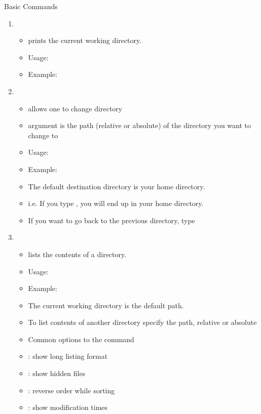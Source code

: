 \documentclass[10pt,t]{beamer}
\begin{document}
\begin{frame}{Basic Commands}
  \begin{enumerate}
  \item {}
    \begin{itemize}
    \item prints the current working directory.
    \item Usage: 
    \item Example: 
    \end{itemize}
  \item {}
    \begin{itemize}
    \item allows one to change directory
    \item argument is the path (relative or absolute) of the directory you want to change to
    \item Usage: 
    \item Example: 
    \item The default destination directory is your home directory.
    \item i.e. If you type , you will end up in your home directory.
    \item If you want to go back to the previous directory, type 
    \end{itemize}
    \framebreak
  \item {}
    \begin{itemize}
    \item lists the contents of a directory.
    \item Usage: 
    \item Example: 
    \item The current working directory is the default path.
    \item To list contents of another directory specify the path, relative or absolute
    \item Common options to the  command 
    \item[] : show long listing format
    \item[] : show hidden files
    \item[] : reverse order while sorting
    \item[] : show modification times

\end{itemize}
\end{enumerate}
\end{frame}
\end{document}
